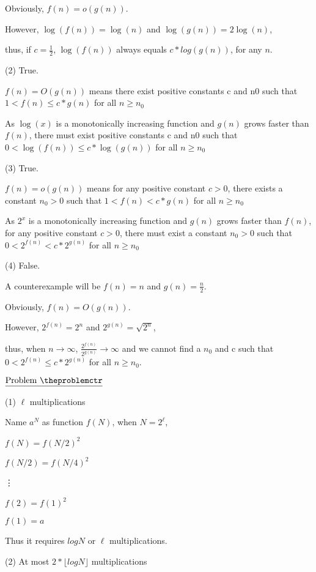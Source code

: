 \documentclass[11pt]{article}
\def\pp{\par\noindent}
\begin{document}
Obviously, $f(n) = o(g(n))$.

However, $\log(f(n))=\log(n)$ and $\log(g(n))=2\log(n)$,

thus, if $c = \frac{1}{2}$, $\log(f(n))$ always equals $c*log(g(n))$, for any $n$.

\bigskip
\bigskip
\noindent
(2) True.

$f(n) = O(g(n))$ means there exist positive constants c and n0 such that $1<f(n) \le c*g(n)$ for all $n \ge n_0$

As $\log(x)$ is a monotonically increasing function and $g(n)$ grows faster than $f(n)$, there must exist positive constants c and n0 such that $0<\log(f(n)) \le c*\log(g(n))$ for all $n \ge n_0$

\bigskip
\bigskip
\noindent
(3) True.

$f(n) = o(g(n))$ means for any positive constant $c>0$, there exists a constant $n_0>0$ such that $1<f(n)<c*g(n)$ for all $n \ge n_0$

As $2^{x}$ is a monotonically increasing function and $g(n)$ grows faster than $f(n)$, for any positive constant $c>0$, there must exist a constant $n_0>0$ such that $0<2^{f(n)}<c*2^{g(n)}$ for all $n \ge n_0$
 
\bigskip
\bigskip
\noindent
(4) False.

A counterexample will be $f(n) = n$ and $g(n) = \frac{n}{2}$.

Obviously, $f(n) = O(g(n))$.

However, $2^{f(n)}=2^{n}$ and $2^{g(n)}=\sqrt{2^n}$,

thus, when $n \rightarrow \infty$, $\frac{2^{f(n)}}{2^{g(n)}} \rightarrow \infty$ and we cannot find a $n_0$ and c such that $0<2^{f(n)} \le c*2^{g(n)}$ for all $n \ge n_0$.

\vfill
\newpage
\addtocounter{problemctr}{1}
\bigskip
\noindent
$\underline{\rm Problem\ \theproblemctr}$\pp 
\noindent
(1) $\ell$ multiplications

Name $a^N$ as function $f(N)$, when $N=2^\ell$, 

$f(N)=f(N/2)^2$

$f(N/2)=f(N/4)^2$

\hspace{.5 cm} \vdots

$f(2)=f(1)^2$

$f(1)=a$

Thus it requires $logN$ or $\ell$ multiplications.

\bigskip
\bigskip
\noindent
(2) At most $2*\lfloor logN \rfloor$ multiplications
\end{document}
